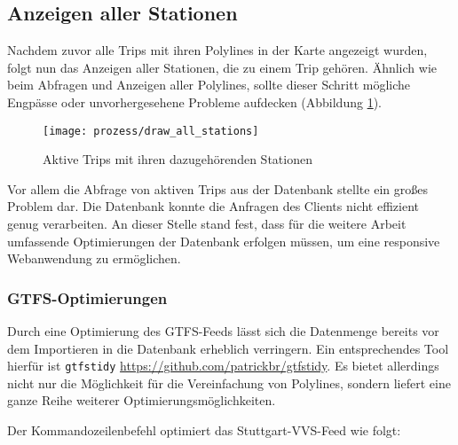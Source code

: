 \subsection{Anzeigen aller Stationen}
\label{sub:anzeigen_aller_stationen}
  Nachdem zuvor alle Trips mit ihren Polylines in der Karte angezeigt wurden, folgt nun das Anzeigen aller Stationen, die zu einem Trip gehören. Ähnlich wie beim Abfragen und Anzeigen aller Polylines, sollte dieser Schritt mögliche Engpässe oder unvorhergesehene Probleme aufdecken (Abbildung \ref{fig:prozess/draw_all_stations}).

  \begin{figure}[htbp]
     \begin{center}
       \texttt{[image: prozess/draw\_all\_stations]}
       \caption{Aktive Trips mit ihren dazugehörenden Stationen}
       \label{fig:prozess/draw_all_stations}
     \end{center}
   \end{figure}
   
  Vor allem die Abfrage von aktiven Trips aus der Datenbank stellte ein großes Problem dar. Die Datenbank konnte die Anfragen des Clients nicht effizient genug verarbeiten. An dieser Stelle stand fest, dass für die weitere Arbeit umfassende Optimierungen der Datenbank erfolgen müssen, um eine responsive Webanwendung zu ermöglichen. 

  \subsubsection{GTFS-Optimierungen}
  \label{ssub:gtfs_optimierungen}
    Durch eine Optimierung des GTFS-Feeds lässt sich die Datenmenge bereits vor dem Importieren in die Datenbank erheblich verringern. Ein entsprechendes Tool hierfür ist \texttt{gtfstidy} \url{https://github.com/patrickbr/gtfstidy}. Es bietet allerdings nicht nur die Möglichkeit für die Vereinfachung von Polylines, sondern liefert eine ganze Reihe weiterer Optimierungsmöglichkeiten. 

    Der Kommandozeilenbefehl \colorbox{materialGrey}{\texttt{\color{white}{\$ gtfstidy -sSiRDeO input.zip output}}} optimiert das Stuttgart-VVS-Feed wie folgt:
    
